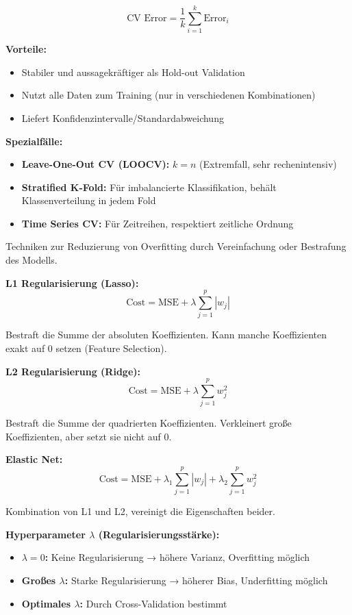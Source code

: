 $$\text{CV Error} = \frac{1}{k} \sum_{i=1}^{k} \text{Error}_i$$

\textbf{Vorteile:}
\begin{itemize}[leftmargin=1.5em]
    \item Stabiler und aussagekräftiger als Hold-out Validation
    \item Nutzt alle Daten zum Training (nur in verschiedenen Kombinationen)
    \item Liefert Konfidenzintervalle/Standardabweichung
\end{itemize}

\textbf{Spezialfälle:}
\begin{itemize}[leftmargin=1.5em]
    \item \textbf{Leave-One-Out CV (LOOCV):} $k = n$ (Extremfall, sehr rechenintensiv)
    \item \textbf{Stratified K-Fold:} Für imbalancierte Klassifikation, behält Klassenverteilung in jedem Fold
    \item \textbf{Time Series CV:} Für Zeitreihen, respektiert zeitliche Ordnung
\end{itemize}

Techniken zur Reduzierung von Overfitting durch Vereinfachung oder Bestrafung des Modells.

\textbf{L1 Regularisierung (Lasso):}
$$\text{Cost} = \text{MSE} + \lambda \sum_{j=1}^{p} |w_j|$$

Bestraft die Summe der absoluten Koeffizienten. Kann manche Koeffizienten exakt auf 0 setzen (Feature Selection).

\textbf{L2 Regularisierung (Ridge):}
$$\text{Cost} = \text{MSE} + \lambda \sum_{j=1}^{p} w_j^2$$

Bestraft die Summe der quadrierten Koeffizienten. Verkleinert große Koeffizienten, aber setzt sie nicht auf 0.

\textbf{Elastic Net:}
$$\text{Cost} = \text{MSE} + \lambda_1 \sum_{j=1}^{p} |w_j| + \lambda_2 \sum_{j=1}^{p} w_j^2$$

Kombination von L1 und L2, vereinigt die Eigenschaften beider.

\textbf{Hyperparameter $\lambda$ (Regularisierungsstärke):}
\begin{itemize}[leftmargin=1.5em]
    \item \textbf{$\lambda = 0$:} Keine Regularisierung → höhere Varianz, Overfitting möglich
    \item \textbf{Großes $\lambda$:} Starke Regularisierung → höherer Bias, Underfitting möglich
    \item \textbf{Optimales $\lambda$:} Durch Cross-Validation bestimmt
\end{itemize}

